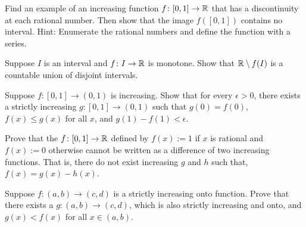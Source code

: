 \begin{exercise}[Challenging] \label{exercise:increasingfuncdiscatQ}
Find an example of an increasing function $f \colon [0,1] \to {\mathbb{R}}$
that has a discontinuity at each rational number.  Then show that the image
$f([0,1])$ contains no interval.  Hint: Enumerate
the rational numbers and define
the function with a series.
\end{exercise}

\begin{exercise}
Suppose $I$ is an interval and $f \colon I \to {\mathbb{R}}$ is monotone.
Show that ${\mathbb{R}} \setminus f(I)$ is a countable union of disjoint intervals.
\end{exercise}

\begin{exercise}
Suppose $f \colon [0,1] \to (0,1)$ is increasing.  Show that for every
$\epsilon > 0$, there exists
a strictly increasing $g \colon [0,1] \to (0,1)$ such that
$g(0) = f(0)$, $f(x) \leq g(x)$ for all $x$, and $g(1)-f(1) < \epsilon$.
\end{exercise}

\begin{exercise}
Prove that the 
$f \colon [0,1] \to{\mathbb{R}}$ defined by $f(x) :=
1$ if $x$ is rational and $f(x) := 0$ otherwise cannot be written as a
difference of two increasing functions.  That is, there do not exist
increasing $g$ and $h$ such that, $f(x) = g(x) - h(x)$.
\end{exercise}

\begin{exercise}
Suppose $f \colon (a,b) \to (c,d)$ is a strictly increasing
onto function.  Prove that there exists a $g \colon (a,b) \to (c,d)$,
which is also strictly increasing and onto, and $g(x) < f(x)$ for all $x \in
(a,b)$.
\end{exercise}


